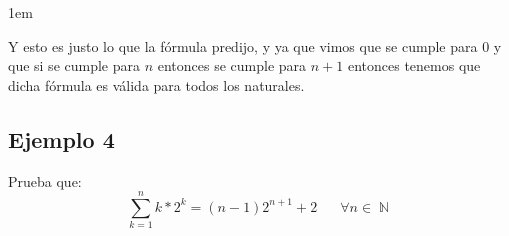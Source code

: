 \documentclass[12pt, fleqn]{report}                             %
\newenvironment{SmallIndentation}[1][0.75em]                    %
        {\begin{adjustwidth}{#1}{}\begin{footnotesize}}             %
        {\end{footnotesize}\end{adjustwidth}}                       %
\DeclareMathOperator \Space     {\quad}                         %
\theoremstyle{break}                                            %
\DeclareMathOperator \Naturals     {\mathbb{N}}                 %
\begin{document}
\begin{SmallIndentation}[1em]
\begin{itemize}
                        Y esto es justo lo que la fórmula predijo, y ya que vimos que se cumple
                        para $0$ y que si se cumple para $n$ entonces se cumple para $n+1$ entonces
                        tenemos que dicha fórmula es válida para todos los naturales.
                        
                    \end{itemize}

                    

                \end{SmallIndentation}

            \clearpage
            \subsection*{Ejemplo 4}

                Prueba que:
                \begin{equation*}
                    \sum_{k=1}^n k * 2^k = (n-1)2^{n+1} + 2
                    \Space \forall n \in \Naturals 
                \end{equation*}
\end{document}
